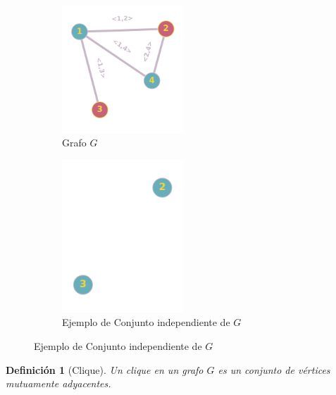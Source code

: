 \documentclass[a4paper,1pt]{report}
\newtheorem*{dfn}{Definición}
\begin{document}
\begin{figure}[H]
    \centering
    \begin{subfigure}[b]{0.45\textwidth}
    \centering
    \includegraphics[width=0.5\textwidth]{figures/independiente.png}
    \caption{Grafo $G$}
    \end{subfigure}
    \begin{subfigure}[b]{0.35\textwidth}
        \centering
    \includegraphics[width=0.5\textwidth]{figures/independiente2.png}
    \caption{Ejemplo de Conjunto independiente de $G$}
    \end{subfigure}
\end{figure} 

\begin{dfn}[Clique]
    Un clique  en un grafo $G$ es un conjunto de vértices mutuamente adyacentes.
\end{dfn}
\end{document}
